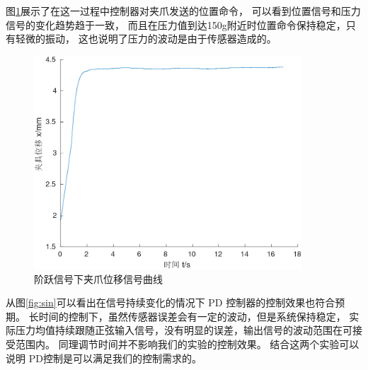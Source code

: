 图\ref{fig:150_x}展示了在这一过程中控制器对夹爪发送的位置命令，
可以看到位置信号和压力信号的变化趋势趋于一致，
而且在压力值到达150g附近时位置命令保持稳定，只有轻微的振动，
这也说明了压力的波动是由于传感器造成的。

\begin{figure}[!ht]
  \centering
  \includegraphics[width=10cm]{chapter04/pic/150_x}
  \caption{\label{fig:150_x}
    阶跃信号下夹爪位移信号曲线}
  \vspace{-0.3cm}
\end{figure}





从图\ref{fig:sin}可以看出在信号持续变化的情况下 PD 控制器的控制效果也符合预期。
长时间的控制下，虽然传感器误差会有一定的波动，但是系统保持稳定，
实际压力均值持续跟随正弦输入信号，没有明显的误差，输出信号的波动范围在可接受范围内。
同理调节时间并不影响我们的实验的控制效果。
结合这两个实验可以说明 PD控制是可以满足我们的控制需求的。

